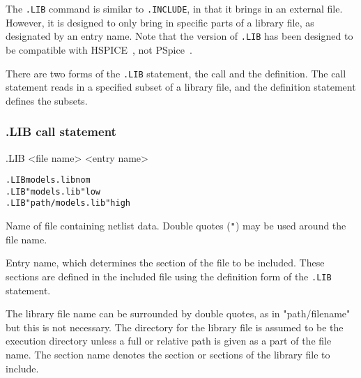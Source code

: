 


The \texttt{.LIB} command is similar to \texttt{.INCLUDE}, in that it
brings in an external file.  However, it is
designed to only bring in specific parts of a library file, as designated
by an entry name.
Note that the \Xyce{} version of \texttt{.LIB} has been designed to be compatible
with HSPICE~\cite{Hspice}, not PSpice~\cite{Pspice}.

There are two forms of the \texttt{.LIB} statement, the call and the
definition.  The call statement reads in a specified subset of a
library file, and the definition statement defines the subsets.

\subsubsection{.LIB call statement}
\begin{Command}
\format
.LIB <file name> <entry name>

\examples
\begin{alltt}
.LIB models.lib nom
.LIB "models.lib"  low
.LIB "path/models.lib"  high
\end{alltt}

\arguments

\begin{Arguments}

Name of file containing netlist data.  Double quotes (\texttt{"}) may be used around the file name.

Entry name, which determines the section of the file to be included.
These sections are defined in the included file using the definition
form of the \texttt{.LIB} statement.

\end{Arguments}
\end{Command}

The library file name can be surrounded by double quotes, as in "path/filename" but
this is not necessary.  The directory for the library file is assumed to be
the execution directory unless a full or relative path is given as a
part of the file name.  The section name denotes the section or sections of the
library file to include.

